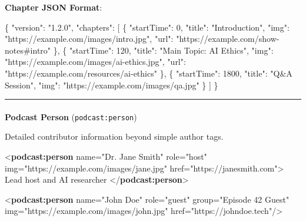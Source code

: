 \documentclass[
  letterpaper,
  DIV=11,
  numbers=noendperiod]{scrartcl}
\makeatletter
\let\oldparagraph\paragraph
\renewcommand{\paragraph}{
    \@ifstar
      \xxxParagraphStar
      \xxxParagraphNoStar
  }
\newcommand{\xxxParagraphStar}[1]{\oldparagraph*{#1}\mbox{}}
\newcommand{\xxxParagraphNoStar}[1]{\oldparagraph{#1}\mbox{}}
\newenvironment{Shaded}{\begin{snugshade}}{\end{snugshade}}
\newcommand{\DataTypeTok}[1]{\textcolor[rgb]{0.68,0.00,0.00}{#1}}
\newcommand{\DecValTok}[1]{\textcolor[rgb]{0.68,0.00,0.00}{#1}}
\newcommand{\FunctionTok}[1]{\textcolor[rgb]{0.28,0.35,0.67}{#1}}
\newcommand{\KeywordTok}[1]{\textcolor[rgb]{0.00,0.23,0.31}{\textbf{#1}}}
\newcommand{\NormalTok}[1]{\textcolor[rgb]{0.00,0.23,0.31}{#1}}
\newcommand{\OtherTok}[1]{\textcolor[rgb]{0.00,0.23,0.31}{#1}}
\newcommand{\StringTok}[1]{\textcolor[rgb]{0.13,0.47,0.30}{#1}}
\makeatother
\begin{document}
\textbf{Chapter JSON Format}:

\begin{Shaded}
\begin{Highlighting}[]
\FunctionTok{\{}
  \DataTypeTok{"version"}\FunctionTok{:} \StringTok{"1.2.0"}\FunctionTok{,}
  \DataTypeTok{"chapters"}\FunctionTok{:} \OtherTok{[}
    \FunctionTok{\{}
      \DataTypeTok{"startTime"}\FunctionTok{:} \DecValTok{0}\FunctionTok{,}
      \DataTypeTok{"title"}\FunctionTok{:} \StringTok{"Introduction"}\FunctionTok{,}
      \DataTypeTok{"img"}\FunctionTok{:} \StringTok{"https://example.com/images/intro.jpg"}\FunctionTok{,}
      \DataTypeTok{"url"}\FunctionTok{:} \StringTok{"https://example.com/show{-}notes\#intro"}
    \FunctionTok{\}}\OtherTok{,}
    \FunctionTok{\{}
      \DataTypeTok{"startTime"}\FunctionTok{:} \DecValTok{120}\FunctionTok{,}
      \DataTypeTok{"title"}\FunctionTok{:} \StringTok{"Main Topic: AI Ethics"}\FunctionTok{,}
      \DataTypeTok{"img"}\FunctionTok{:} \StringTok{"https://example.com/images/ai{-}ethics.jpg"}\FunctionTok{,}
    \DataTypeTok{"url"}\FunctionTok{:} \StringTok{"https://example.com/resources/ai{-}ethics"}
  \FunctionTok{\}}\OtherTok{,}
    \FunctionTok{\{}
      \DataTypeTok{"startTime"}\FunctionTok{:} \DecValTok{1800}\FunctionTok{,}
      \DataTypeTok{"title"}\FunctionTok{:} \StringTok{"Q\&A Session"}\FunctionTok{,}
      \DataTypeTok{"img"}\FunctionTok{:} \StringTok{"https://example.com/images/qa.jpg"}
    \FunctionTok{\}}
  \OtherTok{]}
\FunctionTok{\}}
\end{Highlighting}
\end{Shaded}

\begin{center}\rule{0.5\linewidth}{0.5pt}\end{center}

\paragraph{\texorpdfstring{\textbf{Podcast Person}
(\texttt{podcast:person})}{Podcast Person (podcast:person)}}\label{podcast-person-podcastperson}

Detailed contributor information beyond simple author tags.

\begin{Shaded}
\begin{Highlighting}[]
\NormalTok{\textless{}}\KeywordTok{podcast:person} 
\OtherTok{    name=}\StringTok{"Dr. Jane Smith"} 
\OtherTok{    role=}\StringTok{"host"} 
\OtherTok{    img=}\StringTok{"https://example.com/images/jane.jpg"} 
\OtherTok{    href=}\StringTok{"https://janesmith.com"}\NormalTok{\textgreater{}}
\NormalTok{  Lead host and AI researcher}
\NormalTok{\textless{}/}\KeywordTok{podcast:person}\NormalTok{\textgreater{}}

\NormalTok{\textless{}}\KeywordTok{podcast:person} 
\OtherTok{    name=}\StringTok{"John Doe"} 
\OtherTok{    role=}\StringTok{"guest"} 
\OtherTok{    group=}\StringTok{"Episode 42 Guest"}
\OtherTok{ img=}\StringTok{"https://example.com/images/john.jpg"}
\OtherTok{    href=}\StringTok{"https://johndoe.tech"}\NormalTok{/\textgreater{}}
\end{Highlighting}
\end{Shaded}
\end{document}
